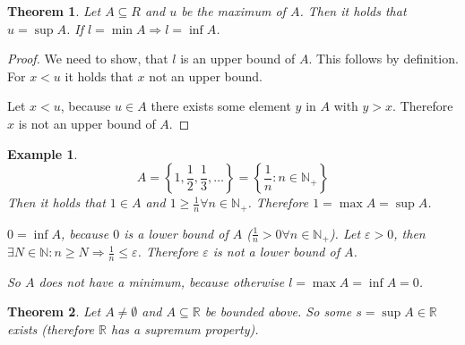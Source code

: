 \documentclass[a4paper,landscape,twocolumn]{article}
\newtheorem{theorem}{Theorem}
\newtheorem{ex}{Example}
\newcommand\set[1]{\left\{#1\right\}}
\begin{document}
\begin{theorem}
  Let $A \subseteq R$ and $u$ be the maximum of $A$. Then it holds that
  $u = \sup{A}$. If $l = \min{A} \Rightarrow l = \inf{A}$.
\end{theorem}

\begin{proof}
  We need to show, that $l$ is an upper bound of $A$.
  This follows by definition.
  For $x < u$ it holds that $x$ not an upper bound.

  Let $x < u$, because $u \in A$ there exists some element $y$ in $A$
  with $y > x$. Therefore $x$ is not an upper bound of $A$.
\end{proof}

\begin{ex}
  \[ A = \set{1, \frac12, \frac13, \ldots} = \set{\frac1n: n \in \mathbb N_+} \]
  Then it holds that $1 \in A$ and $1 \geq \frac1n \forall n \in \mathbb N_+$.
  Therefore $1 = \max{A} = \sup{A}$.

  $0 = \inf{A}$, because $0$ is a lower bound of $A$ ($\frac1n > 0 \forall n \in \mathbb N_+$).
  Let $\varepsilon > 0$, then $\exists N \in \mathbb N: n \geq N
  \Rightarrow \frac1n \leq \varepsilon$. Therefore $\varepsilon$ is not a lower bound of $A$.

  So $A$ does not have a minimum, because otherwise $l = \max{A} = \inf{A} = 0$.
\end{ex}

\begin{theorem}
  Let $A \neq \emptyset$ and $A \subseteq \mathbb R$ be bounded above.
  So some $s = \sup{A} \in \mathbb R$ exists (therefore $\mathbb R$ has a supremum property).
\end{theorem}
\end{document}
